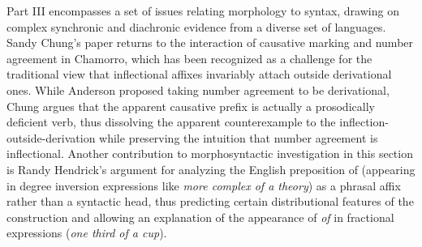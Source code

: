 \begin{refsection}
Part III encompasses a set of issues relating morphology to syntax, drawing on complex synchronic and diachronic evidence from a diverse set of languages.  Sandy Chung's paper returns to the interaction of causative marking and number agreement in Chamorro, which has been recognized as a challenge for the traditional view that inflectional affixes invariably attach outside derivational ones. While Anderson proposed taking number agreement to be derivational, Chung argues that the apparent causative prefix is actually a prosodically deficient verb, thus dissolving the apparent counterexample to the inflection-outside-derivation while preserving the intuition that number agreement is inflectional. Another contribution to morphosyntactic investigation in this section is Randy Hendrick's argument for analyzing the English preposition of (appearing in degree inversion expressions like \textit{more complex of a theory}) as a phrasal affix rather than a syntactic head, thus predicting certain distributional features of the construction and allowing an explanation of the appearance of \textit{of} in fractional expressions (\textit{one third of a cup}).  


\end{refsection}
